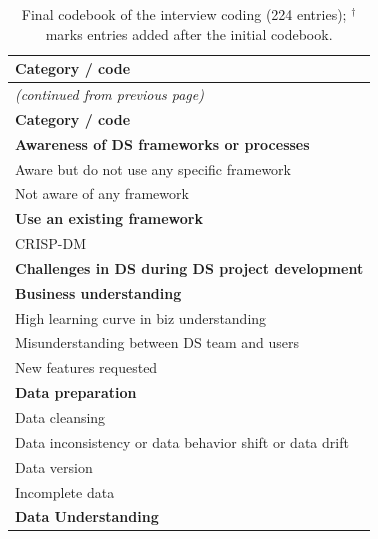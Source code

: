 \documentclass[11pt]{article}
\begin{document}
\begin{longtable}{@{}p{15cm}@{}}
\caption{Final codebook of the interview coding (224 entries); $^\dagger$ marks entries added after the initial codebook.}
\label{tab:supp_codebook} \\
\toprule
\textbf{Category / code} \\
\midrule
\endfirsthead
\multicolumn{1}{l}{\textit{(continued from previous page)}} \\
\toprule
\textbf{Category / code} \\
\midrule
\endhead
\bottomrule
\endfoot
\hspace*{0.0em}\textbf{Awareness of DS frameworks or processes} \\
\hspace*{1.5em}Aware but do not use any specific framework \\
\hspace*{1.5em}Not aware of any framework \\
\hspace*{1.5em}\textbf{Use an existing framework} \\
\hspace*{3.0em}CRISP-DM \\
\hspace*{0.0em}\textbf{Challenges in DS during DS project development} \\
\hspace*{1.5em}\textbf{Business understanding} \\
\hspace*{3.0em}High learning curve in biz understanding \\
\hspace*{3.0em}Misunderstanding between DS team and users \\
\hspace*{3.0em}New features requested \\
\hspace*{1.5em}\textbf{Data preparation} \\
\hspace*{3.0em}Data cleansing \\
\hspace*{3.0em}Data inconsistency or data behavior shift or data drift \\
\hspace*{3.0em}Data version \\
\hspace*{3.0em}Incomplete data \\
\hspace*{1.5em}\textbf{Data Understanding} \\

\end{longtable}
\end{document}

